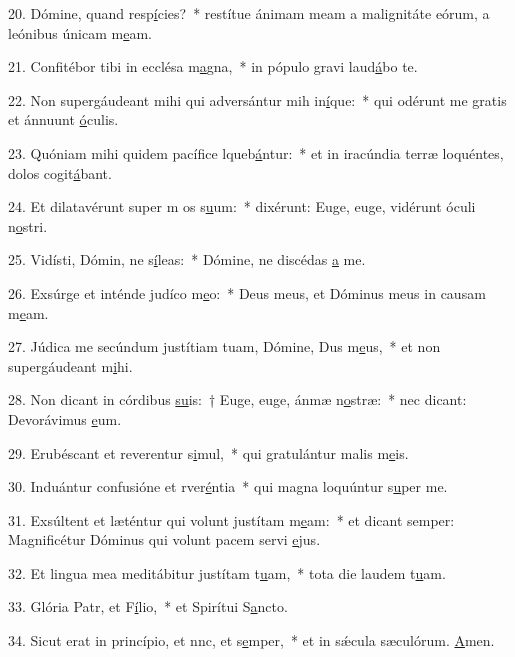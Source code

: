 20. Dómine, quand resp\uline{í}cies?~* restítue ánimam meam a malignitáte eórum, a leónibus únicam m\uline{e}am.\par 
21. Confitébor tibi in ecclésa m\uline{a}gna,~* in pópulo gravi laud\uline{á}bo te.\par 
22. Non supergáudeant mihi qui adversántur mih in\uline{í}que:~* qui odérunt me gratis et ánnuunt \uline{ó}culis.\par 
23. Quóniam mihi quidem pacífice lqueb\uline{á}ntur:~* et in iracúndia terræ loquéntes, dolos cogit\uline{á}bant.\par 
24. Et dilatavérunt super m os s\uline{u}um:~* dixérunt: Euge, euge, vidérunt óculi n\uline{o}stri.\par 
25. Vidísti, Dómin, ne s\uline{í}leas:~* Dómine, ne discédas \uline{a} me.\par 
26. Exsúrge et inténde judíco m\uline{e}o:~* Deus meus, et Dóminus meus in causam m\uline{e}am.\par 
27. Júdica me secúndum justítiam tuam, Dómine, Dus m\uline{e}us,~* et non supergáudeant m\uline{i}hi.\par 
28. Non dicant in córdibus \uline{su}is:~† Euge, euge, ánmæ n\uline{o}stræ:~* nec dicant: Devorávimus \uline{e}um.\par 
29. Erubéscant et reverentur s\uline{i}mul,~* qui gratulántur malis m\uline{e}is.\par 
30. Induántur confusióne et rver\uline{é}ntia~* qui magna loquúntur s\uline{u}per me.\par 
31. Exsúltent et læténtur qui volunt justítam m\uline{e}am:~* et dicant semper: Magnificétur Dóminus qui volunt pacem servi \uline{e}jus.\par 
32. Et lingua mea meditábitur justítam t\uline{u}am,~* tota die laudem t\uline{u}am.\par 
33. Glória Patr, et F\uline{í}lio,~* et Spirítui S\uline{a}ncto.\par 
34. Sicut erat in princípio, et nnc, et s\uline{e}mper,~* et in sǽcula sæculórum. \uline{A}men.\par 
